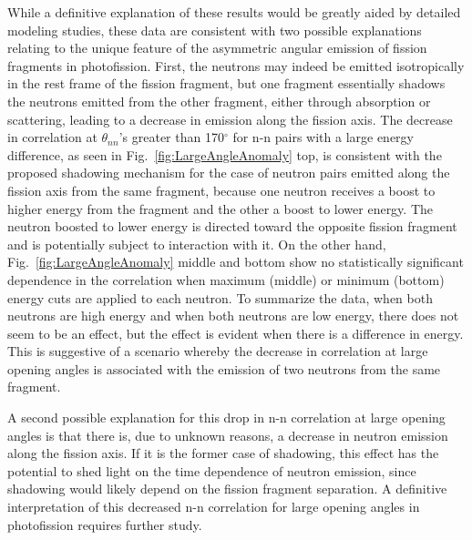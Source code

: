 While a definitive explanation of these results would be greatly aided by detailed modeling studies,
these data are consistent with two possible explanations relating to the unique feature of the asymmetric angular emission of fission fragments in photofission.
First, the neutrons may indeed be emitted isotropically in the rest frame of the fission fragment, but one fragment essentially shadows the neutrons emitted from the other fragment, either through absorption or scattering, leading to a decrease in emission along the fission axis.
The decrease in correlation at $\theta_{nn}$'s greater than 170$^{\circ}$ for n-n pairs with a large energy difference, as seen in Fig.~\ref{fig:LargeAngleAnomaly} top, is consistent with the proposed shadowing mechanism for the case of neutron pairs emitted along the fission axis from the same fragment, because one neutron receives a boost to higher energy from the fragment and the other a boost to lower energy.
The neutron boosted to lower energy is directed toward the opposite fission fragment and is potentially subject to interaction with it.
On the other hand, Fig.~\ref{fig:LargeAngleAnomaly} middle and bottom show no statistically significant dependence in the correlation when maximum (middle) or minimum (bottom) energy cuts are applied to each neutron.
To summarize the data, when both neutrons are high energy and when both neutrons are low energy, there does not seem to be an effect, but the effect is evident when there is a difference in energy.
This is suggestive of a scenario whereby the decrease in correlation at large opening angles is associated with the emission of two neutrons from the same fragment.

A second possible explanation for this drop in n-n correlation at large opening angles is that there is, due to unknown reasons, a decrease in neutron emission along the fission axis.
If it is the former case of shadowing, this effect has the potential to shed light on the time dependence of neutron emission, since shadowing would likely depend on the fission fragment separation.
A definitive interpretation of this decreased n-n correlation for large opening angles in photofission requires further study.

